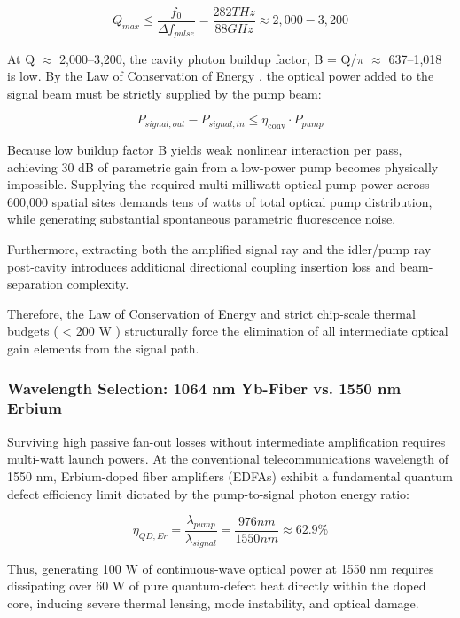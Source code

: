 \documentclass[journal]{IEEEtran}
\begin{document}
\begin{itemize}
\begin{equation}
Q_{max} \le \frac{f_{0}}{\Delta f_{pulse}}
= \frac{282 THz}{88 GHz} \approx 2,000-3,200
\end{equation}

At Q $\approx$ 2,000--3,200, the cavity photon buildup factor, B = Q/$\pi$ $\approx$ 637--1,018 is low. By the Law of Conservation of Energy , the optical power added to the signal beam must be strictly supplied by the pump beam:

\begin{equation}
P_{signal,out} - P_{signal,in} \le \eta_{\text{conv}} \cdot P_{pump}
\end{equation}

Because low buildup factor B yields weak nonlinear interaction per pass, achieving 30 dB of parametric gain from a low-power pump becomes physically impossible. Supplying the required multi-milliwatt optical pump power across 600,000 spatial sites demands tens of watts of total optical pump distribution, while generating substantial spontaneous parametric fluorescence noise. 
\end{itemize}

Furthermore, extracting both the amplified signal ray and the idler/pump ray post-cavity introduces additional directional coupling insertion loss and beam-separation complexity.

Therefore, the Law of Conservation of Energy and strict chip-scale thermal budgets ( < 200 W ) structurally force the elimination of all intermediate optical gain elements from the signal path.

\subsubsection{\textbf{Wavelength Selection: 1064 nm Yb-Fiber vs. 1550 nm Erbium}}
Surviving high passive fan-out losses without intermediate amplification requires multi-watt launch powers. At the conventional telecommunications wavelength of 1550 nm, Erbium-doped fiber amplifiers (EDFAs) exhibit a fundamental quantum defect efficiency limit dictated by the pump-to-signal photon energy ratio:

\begin{equation}
\eta_{QD,Er} = \frac{\lambda_{pump}}{\lambda_{signal}}
= \frac{976 nm}{1550 nm} \approx 62.9 \%
\end{equation}

Thus, generating 100 W of continuous-wave optical power at 1550 nm requires dissipating over 60 W of pure quantum-defect heat directly within the doped core, inducing severe thermal lensing, mode instability, and optical damage.
\end{document}
